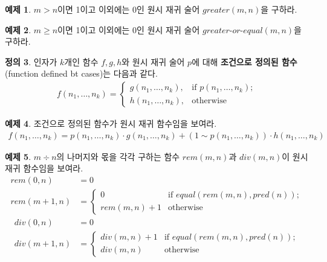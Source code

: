 \documentclass[b5paper, 11pt]{book}
\theoremstyle{definition}
\newtheorem{defn}{정의}[chapter]
\newtheorem{ex}[defn]{예제}
\begin{document}
\begin{ex}
    $m > n$이면 1이고 이외에는 0인 원시 재귀 술어 $greater(m,n)$을 구하라. 
\end{ex}
\begin{ex}
    $m \ge n$이면 1이고 이외에는 0인 원시 재귀 술어 $greater\text{-}or\text{-}equal(m,n)$을 구하라.
\end{ex}
\begin{defn}
    인자가 $k$개인 함수 $f, g, h$와 원시 재귀 술어 $p$에 대해 
    \textbf{조건으로 정의된 함수}(function defined bt cases)는 다음과 같다.
    \begin{align*}
        f(n_1, \ldots, n_k) = 
        \begin{cases}
            g(n_1, \ldots , n_k), & \text{if } p(n_1, \ldots, n_k); \\
            h(n_1, \ldots, n_k),  & \text{otherwise}
        \end{cases}
    \end{align*}
\end{defn}
\begin{ex}
    조건으로 정의된 함수가 원시 재귀 함수임을 보여라.
    \begin{align*}
        f(n_1, \ldots, n_k) = p(n_1, \ldots, n_k) \cdot g(n_1, \ldots, n_k) + (1\sim p(n_1, \ldots, n_k)) \cdot h(n_1, \ldots, n_k)
    \end{align*}
\end{ex}
\begin{ex}
    $m \div n$의 나머지와 몫을 각각 구하는 함수 $rem(m,n)$과 $div(m,n)$이 원시 재귀 함수임을 보여라.  
    \begin{align*}
        rem(0,n) &= 0 \\
        rem(m+1, n) &= 
        \begin{cases}
            0 & \text{if } equal(rem(m,n), pred(n)); \\ 
            rem(m,n) + 1 & \text{otherwise}
        \end{cases} 
    \end{align*}
    \begin{align*}
        div(0,n) &= 0 \\
        div(m+1, n) &= 
        \begin{cases}
            div(m, n) + 1 & \text{if } equal(rem(m,n), pred(n)); \\ 
            div(m,n) & \text{otherwise}
        \end{cases} 
    \end{align*}
\end{ex}
\end{document}
